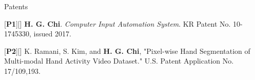 \begin{cventries}

\cvpub
{Patents}{
\begin{cvitems}
\item {[\textbf{P1}][\href{https://docs.google.com/viewer?url=https://github.com/stnoah1/CV/raw/master/documents/patent.pdf}{}] \textbf{H. G. Chi}.  \textit{Computer Input Automation System}. KR Patent No. 10-1745330, issued 2017.}
\item {[\textbf{P2}][\href{https://patentimages.storage.googleapis.com/38/0d/99/aaea450434214f/US20210166393A1.pdf}{}] K. Ramani, S. Kim, and \textbf{H. G. Chi}, "Pixel-wise Hand Segmentation of Multi-modal Hand Activity Video Dataset." U.S. Patent Application No. 17/109,193.}
\end{cvitems}
}



\end{cventries}
